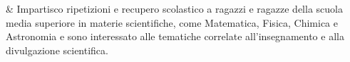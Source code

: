 & Impartisco ripetizioni e recupero scolastico a ragazzi e ragazze della scuola media superiore in materie scientif\mbox{}iche, come Matematica, Fisica, Chimica e Astronomia e sono interessato alle tematiche correlate all'insegnamento e alla divulgazione scientif\mbox{}ica.\\